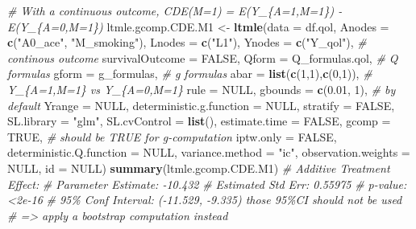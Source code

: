 \documentclass[
]{book}
\newenvironment{Shaded}{\begin{snugshade}}{\end{snugshade}}
\newcommand{\AttributeTok}[1]{\textcolor[rgb]{0.13,0.29,0.53}{#1}}
\newcommand{\CommentTok}[1]{\textcolor[rgb]{0.56,0.35,0.01}{\textit{#1}}}
\newcommand{\ConstantTok}[1]{\textcolor[rgb]{0.56,0.35,0.01}{#1}}
\newcommand{\DecValTok}[1]{\textcolor[rgb]{0.00,0.00,0.81}{#1}}
\newcommand{\FloatTok}[1]{\textcolor[rgb]{0.00,0.00,0.81}{#1}}
\newcommand{\FunctionTok}[1]{\textcolor[rgb]{0.13,0.29,0.53}{\textbf{#1}}}
\newcommand{\NormalTok}[1]{#1}
\newcommand{\OtherTok}[1]{\textcolor[rgb]{0.56,0.35,0.01}{#1}}
\newcommand{\StringTok}[1]{\textcolor[rgb]{0.31,0.60,0.02}{#1}}
\begin{document}
\begin{Shaded}
\begin{Highlighting}[]
\CommentTok{\# With a continuous outcome, CDE(M=1) = E(Y\_\{A=1,M=1\}) {-} E(Y\_\{A=0,M=1\})}
\NormalTok{ltmle.gcomp.CDE.M1 }\OtherTok{\textless{}{-}} \FunctionTok{ltmle}\NormalTok{(}\AttributeTok{data =}\NormalTok{ df.qol,}
                            \AttributeTok{Anodes =} \FunctionTok{c}\NormalTok{(}\StringTok{"A0\_ace"}\NormalTok{, }\StringTok{"M\_smoking"}\NormalTok{),}
                            \AttributeTok{Lnodes =} \FunctionTok{c}\NormalTok{(}\StringTok{"L1"}\NormalTok{),}
                            \AttributeTok{Ynodes =} \FunctionTok{c}\NormalTok{(}\StringTok{"Y\_qol"}\NormalTok{), }\CommentTok{\# continous outcome}
                            \AttributeTok{survivalOutcome =} \ConstantTok{FALSE}\NormalTok{,}
                            \AttributeTok{Qform =}\NormalTok{ Q\_formulas.qol, }\CommentTok{\# Q formulas}
                            \AttributeTok{gform =}\NormalTok{ g\_formulas, }\CommentTok{\# g formulas}
                            \AttributeTok{abar =} \FunctionTok{list}\NormalTok{(}\FunctionTok{c}\NormalTok{(}\DecValTok{1}\NormalTok{,}\DecValTok{1}\NormalTok{),}\FunctionTok{c}\NormalTok{(}\DecValTok{0}\NormalTok{,}\DecValTok{1}\NormalTok{)), }\CommentTok{\# Y\_\{A=1,M=1\} vs Y\_\{A=0,M=1\}}
                            \AttributeTok{rule =} \ConstantTok{NULL}\NormalTok{,}
                            \AttributeTok{gbounds =} \FunctionTok{c}\NormalTok{(}\FloatTok{0.01}\NormalTok{, }\DecValTok{1}\NormalTok{), }\CommentTok{\# by default}
                            \AttributeTok{Yrange =} \ConstantTok{NULL}\NormalTok{,}
                            \AttributeTok{deterministic.g.function =} \ConstantTok{NULL}\NormalTok{,}
                            \AttributeTok{stratify =} \ConstantTok{FALSE}\NormalTok{,}
                            \AttributeTok{SL.library =} \StringTok{"glm"}\NormalTok{,}
                            \AttributeTok{SL.cvControl =} \FunctionTok{list}\NormalTok{(),}
                            \AttributeTok{estimate.time =} \ConstantTok{FALSE}\NormalTok{,}
                            \AttributeTok{gcomp =} \ConstantTok{TRUE}\NormalTok{, }\CommentTok{\# should be TRUE for g{-}computation}
                            \AttributeTok{iptw.only =} \ConstantTok{FALSE}\NormalTok{,}
                            \AttributeTok{deterministic.Q.function =} \ConstantTok{NULL}\NormalTok{,}
                            \AttributeTok{variance.method =} \StringTok{"ic"}\NormalTok{,}
                            \AttributeTok{observation.weights =} \ConstantTok{NULL}\NormalTok{,}
                            \AttributeTok{id =} \ConstantTok{NULL}\NormalTok{)}
\FunctionTok{summary}\NormalTok{(ltmle.gcomp.CDE.M1)}
\CommentTok{\# Additive Treatment Effect:}
\CommentTok{\#   Parameter Estimate:  {-}10.432}
\CommentTok{\#    Estimated Std Err:  0.55975}
\CommentTok{\#              p{-}value:  \textless{}2e{-}16}
\CommentTok{\#    95\% Conf Interval: ({-}11.529, {-}9.335) those 95\%CI should not be used}
\CommentTok{\#                      =\textgreater{} apply a bootstrap computation instead}
\end{Highlighting}
\end{Shaded}
\end{document}
